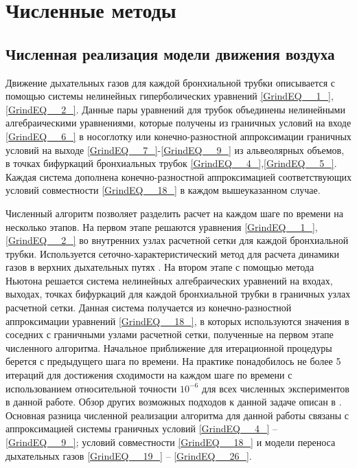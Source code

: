 \section{Численные методы}
\subsection{Численная реализация модели движения воздуха}

Движение дыхательных газов для каждой бронхиальной трубки описывается с помощью системы нелинейных гиперболических уравнений \eqref{GrindEQ__1_},\eqref{GrindEQ__2_}. Данные пары уравнений для трубок объединены нелинейными алгебраическими уравнениями, которые получены из граничных условий на входе \eqref{GrindEQ__6_} в носоглотку или конечно-разностной аппроксимации граничных условий на выходе \eqref{GrindEQ__7_}-\eqref{GrindEQ__9_} из альвеолярных объемов, в точках бифуркаций бронхиальных трубок \eqref{GrindEQ__4_},\eqref{GrindEQ__5_}. Каждая система дополнена конечно-разностной аппроксимацией соответствующих условий совместности \eqref{GrindEQ__18_} в каждом вышеуказанном случае. 

Численный алгоритм позволяет разделить расчет на каждом шаге по времени на несколько этапов.  На первом этапе решаются уравнения \eqref{GrindEQ__1_},\eqref{GrindEQ__2_} во внутренних узлах расчетной сетки для каждой бронхиальной трубки. Используется сеточно-характеристический метод \cite{Magomedov1988} для расчета динамики газов в верхних дыхательных путях \cite{kholodov2001,Vassilevski2011,Bessonov2016}. На втором этапе с помощью метода Ньютона решается система нелинейных алгебраических уравнений на входах, выходах, точках бифуркаций для каждой бронхиальной трубки в граничных узлах расчетной сетки. Данная система получается из конечно-разностной  аппроксимации уравнений \eqref{GrindEQ__18_}, в которых используются значения в соседних с граничными узлами расчетной сетки, полученные на первом этапе численного алгоритма. Начальное приближение для итерационной процедуры берется с предыдущего шага по времени. На практике понадобилось не более 5 итераций для достижения сходимости на каждом шаге по времени с использованием относительной точности $10^{-6} $ для всех численных экспериментов в данной работе. Обзор других возможных подходов к данной задаче описан в \cite{kholodov2001}. Основная разница численной реализации алгоритма для данной работы связаны с аппроксимацией системы граничных условий \eqref{GrindEQ__4_} -- \eqref{GrindEQ__9_}; условий совместности \eqref{GrindEQ__18_} и модели переноса дыхательных газов \eqref{GrindEQ__19_} -- \eqref{GrindEQ__26_}. 

